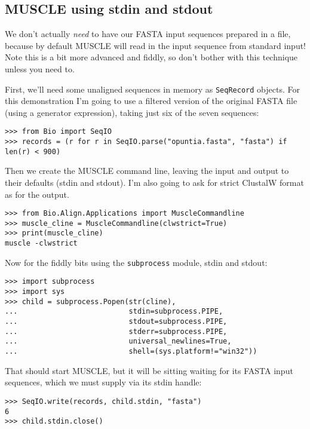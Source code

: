 \subsection{MUSCLE using stdin and stdout}

We don't actually \emph{need} to have our FASTA input sequences prepared in a file,
because by default MUSCLE will read in the input sequence from standard input!
Note this is a bit more advanced and fiddly, so don't bother with this technique
unless you need to.

First, we'll need some unaligned sequences in memory as \verb|SeqRecord| objects.
For this demonstration I'm going to use a filtered version of the original FASTA
file (using a generator expression), taking just six of the seven sequences:

\begin{verbatim}
>>> from Bio import SeqIO
>>> records = (r for r in SeqIO.parse("opuntia.fasta", "fasta") if len(r) < 900)
\end{verbatim}

Then we create the MUSCLE command line, leaving the input and output to their
defaults (stdin and stdout). I'm also going to ask for strict ClustalW format
as for the output.

\begin{verbatim}
>>> from Bio.Align.Applications import MuscleCommandline
>>> muscle_cline = MuscleCommandline(clwstrict=True)
>>> print(muscle_cline)
muscle -clwstrict
\end{verbatim}

Now for the fiddly bits using the \verb|subprocess| module, stdin and stdout:

\begin{verbatim}
>>> import subprocess
>>> import sys
>>> child = subprocess.Popen(str(cline),
...                          stdin=subprocess.PIPE,
...                          stdout=subprocess.PIPE,
...                          stderr=subprocess.PIPE,
...                          universal_newlines=True,
...                          shell=(sys.platform!="win32"))
\end{verbatim}

That should start MUSCLE, but it will be sitting waiting for its FASTA input
sequences, which we must supply via its stdin handle:

\begin{verbatim}
>>> SeqIO.write(records, child.stdin, "fasta")
6
>>> child.stdin.close()
\end{verbatim}

